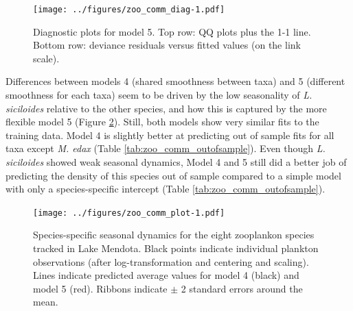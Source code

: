 \documentclass[12pt]{article}
\begin{document}
\begin{figure}
\centering
\texttt{[image: ../figures/zoo\_comm\_diag-1.pdf]}
\caption{\label{fig:zoo_comm_diag_plot} Diagnostic plots for model 5.
Top row: QQ plots plus the 1-1 line. Bottom row: deviance residuals
versus fitted values (on the link scale).}
\end{figure}

Differences between models 4 (shared smoothness between taxa) and 5
(different smoothness for each taxa) seem to be driven by the low
seasonality of \emph{L. siciloides} relative to the other species, and
how this is captured by the more flexible model 5 (Figure
\ref{fig:zoo_comp}). Still, both models show very similar fits to the
training data. Model 4 is slightly better at predicting out of sample
fits for all taxa except \emph{M. edax} (Table
\ref{tab:zoo_comm_outofsample}). Even though \emph{L. siciloides} showed
weak seasonal dynamics, Model 4 and 5 still did a better job of
predicting the density of this species out of sample compared to a
simple model with only a species-specific intercept (Table
\ref{tab:zoo_comm_outofsample}).

\begin{figure}
\centering
\texttt{[image: ../figures/zoo\_comm\_plot-1.pdf]}
\caption{\label{fig:zoo_comp}Species-specific seasonal dynamics for the
eight zooplankon species tracked in Lake Mendota. Black points indicate
individual plankton observations (after log-transformation and centering
and scaling). Lines indicate predicted average values for model 4
(black) and model 5 (red). Ribbons indicate \(\pm\) 2 standard errors
around the mean.}
\end{figure}
\end{document}
